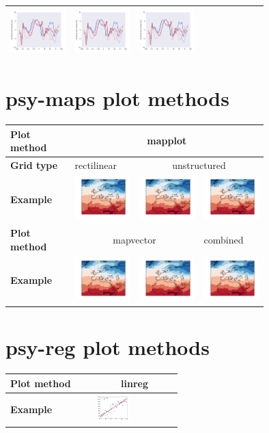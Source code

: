 \begin{refsection}
\begin{subappendices}
\begin{tabular}[c]{l|p{0.25\linewidth}|p{0.25\linewidth}|p{0.25\linewidth}|}
				\includegraphics[width=\linewidth, page=10]{psyplot-figures/psy-simple-demo.pdf} & \includegraphics[width=\linewidth, page=11]{psyplot-figures/psy-simple-demo.pdf} & \includegraphics[width=\linewidth, page=12]{psyplot-figures/psy-simple-demo.pdf} \\
			\bottomrule
		\end{tabular}
	

	\section{psy-maps plot methods}  \label{sec:psy-maps-plotmethods}
	
		\begin{tabular}{l|p{0.25\linewidth}|p{0.25\linewidth}|p{0.25\linewidth}|}
			\toprule
			\textbf{Plot method} & \multicolumn{3}{c}{mapplot} \\
			\hline
			\textbf{Grid type} & rectilinear & \multicolumn{2}{c}{unstructured} \\
			\hline
			\textbf{Example} & 
				\includegraphics[width=\linewidth, page=1]{psyplot-figures/psy-maps-demo.pdf} &
				\includegraphics[width=\linewidth, page=2]{psyplot-figures/psy-maps-demo.pdf} &
				\includegraphics[width=\linewidth, page=3]{psyplot-figures/psy-maps-demo.pdf} \\
			\midrule
			\midrule
			\textbf{Plot method} & \multicolumn{2}{c|}{mapvector} & combined \\
			\hline
			\textbf{Example} & 
				\includegraphics[width=\linewidth, page=4]{psyplot-figures/psy-maps-demo.pdf} &
				\includegraphics[width=\linewidth, page=5]{psyplot-figures/psy-maps-demo.pdf} &
				\includegraphics[width=\linewidth, page=6]{psyplot-figures/psy-maps-demo.pdf} \\
			\bottomrule
		\end{tabular}
	
	\section{psy-reg plot methods}  \label{sec:psy-reg-plotmethods}
	
		\begin{tabular}{l|p{0.25\linewidth}|p{0.25\linewidth}|}
			\toprule
			\textbf{Plot method} & \multicolumn{2}{c}{linreg} \\
			\hline
			\textbf{Example} & 
				\includegraphics[width=\linewidth, page=1]{psyplot-figures/psy-reg-demo.pdf} &
				\includegraphics[width=\linewidth, page=2]
\end{tabular}
\end{subappendices}
\end{refsection}
